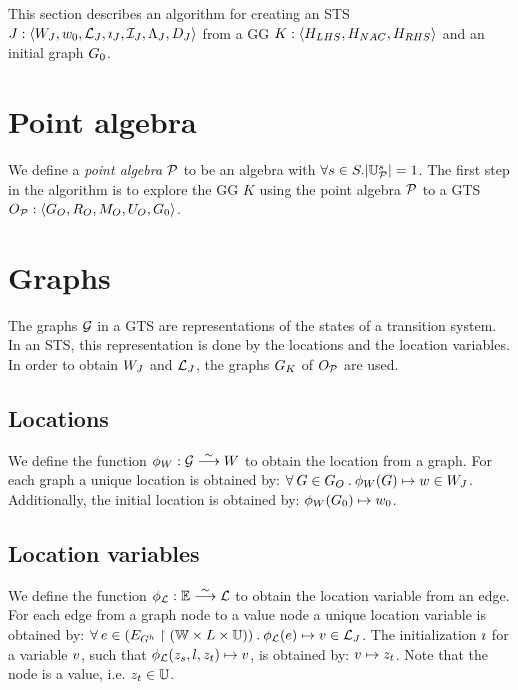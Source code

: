This section describes an algorithm for creating an STS $J: \langle W_J,w_0,\mathcal{L}_J,\imath_J,\mathcal{I}_J,\Lambda_J,D_J\rangle$ from a GG $K: \langle H_{LHS}, H_{NAC}, H_{RHS}\rangle$ and an initial graph $G_0$. 

\section{Point algebra}
We define a \textit{point algebra} $\mathcal{P}$ to be an algebra with $\forall s \in S . |\mathbb{U}_{\mathcal{P}}^s| = 1$. The first step in the algorithm is to explore the GG $K$ using the point algebra $\mathcal{P}$ to a GTS $O_{\mathcal{P}}: \langle G_O, R_O, M_O, U_O, G_0 \rangle$.

\section{Graphs}
The graphs $\mathcal{G}$ in a GTS are representations of the states of a transition system. In an STS, this representation is done by the locations and the location variables. In order to obtain $W_J$ and $\mathcal{L}_J$, the graphs $G_K$ of $O_{\mathcal{P}}$ are used.

\subsection{Locations}
We define the function $\phi_W: \mathcal{G} \stackrel{\sim}{\longrightarrow} W$ to obtain the location from a graph. For each graph a unique location is obtained by: $\forall\: G \in G_O\: .\:\phi_W(G) \mapsto w \in W_J$. Additionally, the initial location is obtained by: $\phi_W(G_0) \mapsto w_0$.

\subsection{Location variables}
We define the function $\phi_{\mathcal{L}}: \mathbb{E} \stackrel{\sim}{\longrightarrow} \mathcal{L}$ to obtain the location variable from an edge. For each edge from a graph node to a value node a unique location variable is obtained by: $\forall\: e \in (E_{G^h}\restriction(\mathbb{W} \times L \times \mathbb{U}))\: .\: \phi_{\mathcal{L}}(e) \mapsto v \in \mathcal{L}_J$. The initialization $\imath$ for a variable $v$, such that $\phi_{\mathcal{L}}(z_s, l, z_t) \mapsto v$, is obtained by: $v \mapsto z_t$. Note that the node is a value, i.e. $z_t \in \mathbb{U}$.

